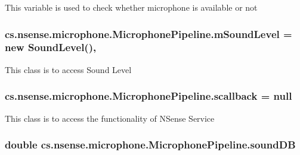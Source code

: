 This variable is used to check whether microphone is available or not \hypertarget{classcs_1_1nsense_1_1microphone_1_1_microphone_pipeline_a34eddb30f49a7969352214be554d413a}{
\subsubsection[{m\-Sound\-Level}]{ cs.\-nsense.\-microphone.\-Microphone\-Pipeline.\-m\-Sound\-Level = new {\bf Sound\-Level}()\hspace{0.3cm}{\ttfamily [static]}, {\ttfamily [private]}}}\label{classcs_1_1nsense_1_1microphone_1_1_microphone_pipeline_a34eddb30f49a7969352214be554d413a}
This class is to access Sound Level \hypertarget{classcs_1_1nsense_1_1microphone_1_1_microphone_pipeline_a9b4ae85f6ec3eae60e6bf9487e4f273a}{
\subsubsection[{scallback}]{ cs.\-nsense.\-microphone.\-Microphone\-Pipeline.\-scallback = null\hspace{0.3cm}{\ttfamily [private]}}}\label{classcs_1_1nsense_1_1microphone_1_1_microphone_pipeline_a9b4ae85f6ec3eae60e6bf9487e4f273a}
This class is to access the functionality of N\-Sense Service \hypertarget{classcs_1_1nsense_1_1microphone_1_1_microphone_pipeline_a925023c3a2910aaf80f77ed11ba60bfa}{
\subsubsection[{sound\-D\-B}]{\setlength{\rightskip}{0pt plus 5cm}double cs.\-nsense.\-microphone.\-Microphone\-Pipeline.\-sound\-D\-B\hspace{0.3cm}{\ttfamily [protected]}}}\label{classcs_1_1nsense_1_1microphone_1_1_microphone_pipeline_a925023c3a2910aaf80f77ed11ba60bfa}
